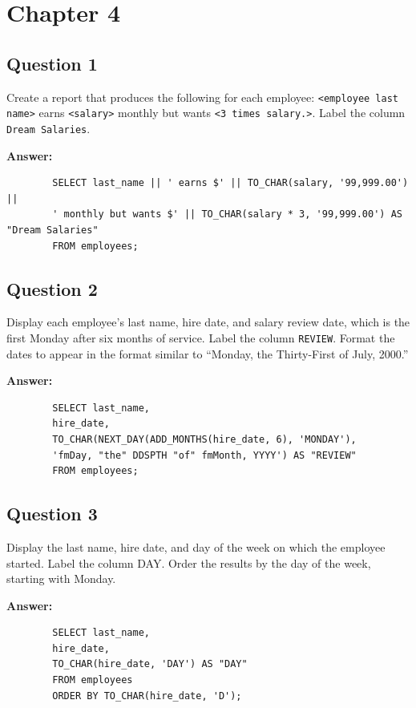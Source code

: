 \documentclass[12pt,a4paper]{article}
\begin{document}
\section*{Chapter 4}

\subsection*{Question 1}
Create a report that produces the following for each employee:
\texttt{<employee last name>} earns \texttt{<salary>} monthly 
but wants \texttt{<3 times salary.>}. Label the column \texttt{Dream Salaries}.

\textbf{Answer:}
    \begin{lstlisting}
        SELECT last_name || ' earns $' || TO_CHAR(salary, '99,999.00') ||
        ' monthly but wants $' || TO_CHAR(salary * 3, '99,999.00') AS "Dream Salaries"
        FROM employees;
    \end{lstlisting}

\subsection*{Question 2}
Display each employee’s last name, hire date, and salary review date, which is the first Monday 
after six months of service. Label the column \texttt{REVIEW}. Format the dates to appear in the format 
similar to “Monday, the Thirty-First of July, 2000.”

\textbf{Answer:}
    \begin{lstlisting}
        SELECT last_name,
        hire_date,
        TO_CHAR(NEXT_DAY(ADD_MONTHS(hire_date, 6), 'MONDAY'),
        'fmDay, "the" DDSPTH "of" fmMonth, YYYY') AS "REVIEW"
        FROM employees;
    \end{lstlisting}
    
\subsection*{Question 3}
Display the last name, hire date, and day of the week on which the employee started. Label the 
column DAY. Order the results by the day of the week, starting with Monday.

\textbf{Answer:}
    \begin{lstlisting}
        SELECT last_name,
        hire_date,
        TO_CHAR(hire_date, 'DAY') AS "DAY"
        FROM employees
        ORDER BY TO_CHAR(hire_date, 'D');
    \end{lstlisting}
    
\end{document}
